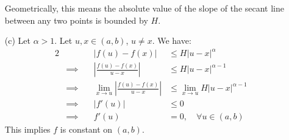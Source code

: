 \begin{solution}
\begin{itemize}
              Geometrically, this means the absolute value of the slope
              of the secant line between any two points is bounded by $H$.
        \item[(c)]
              Let $\alpha > 1$. Let $u,x \in (a,b)$, $u \neq x$. We have:
              \begin{alignat*}{2}
                   &                & |f(u) - f(x)|                                           & \leq H|u - x|^\alpha                      \\
                   & \implies \quad & \left| \frac{f(u) - f(x)}{u - x} \right|                & \leq H|u - x|^{\alpha - 1}                \\
                   & \implies \quad & \lim_{x \to u} \left| \frac{f(u) - f(x)}{u - x} \right| & \leq \lim_{x \to u} H|u - x|^{\alpha - 1} \\
                   & \implies \quad & |f'(u)|                                                 & \leq 0                                    \\
                   & \implies \quad & f'(u)                                                   & = 0, \quad \forall u \in (a,b)
              \end{alignat*}
              This implies $f$ is constant on $(a,b)$.
    \end{itemize}
\end{solution}